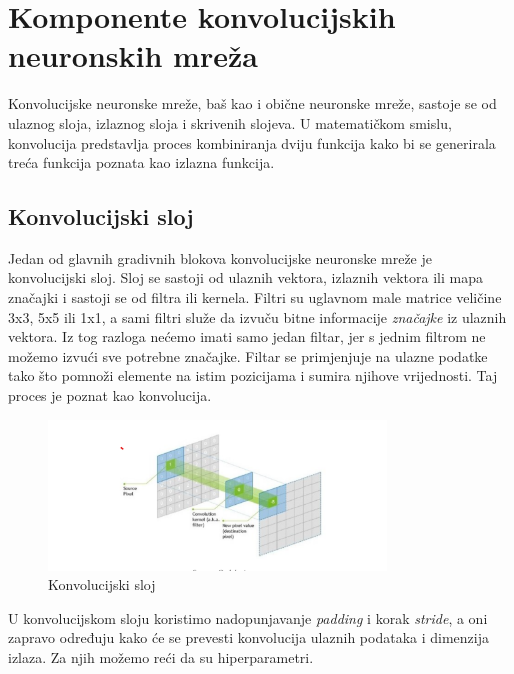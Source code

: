 
\chapter{Komponente konvolucijskih neuronskih mreža}\label{ch:komponente-konvolucijskih-neuronskih-mreza}
Konvolucijske neuronske mreže, baš kao i obične neuronske mreže, sastoje se od ulaznog sloja, izlaznog sloja i skrivenih slojeva.
U matematičkom smislu, konvolucija predstavlja proces kombiniranja dviju funkcija kako bi se generirala treća funkcija poznata kao izlazna funkcija.

\section{Konvolucijski sloj}\label{sec:konvolucijski-sloj}
Jedan od glavnih gradivnih blokova konvolucijske neuronske mreže je konvolucijski sloj.
Sloj se sastoji od ulaznih vektora, izlaznih vektora ili mapa značajki i sastoji se od filtra ili kernela.
Filtri su uglavnom male matrice veličine 3x3, 5x5 ili 1x1, a sami filtri služe da izvuču bitne informacije \emph{značajke} iz ulaznih vektora.
Iz tog razloga nećemo imati samo jedan filtar, jer s jednim filtrom ne možemo izvući sve potrebne značajke.
Filtar se primjenjuje na ulazne podatke tako što pomnoži elemente na istim pozicijama i sumira njihove vrijednosti.
Taj proces je poznat kao konvolucija.

\FloatBarrier
\begin{figure}[h]
    \centering
    \includegraphics[width=0.8\textwidth]{images/Convolution}
    \caption{Konvolucijski sloj}
    \label{fig:slika13}
\end{figure}
\FloatBarrier

U konvolucijskom sloju koristimo nadopunjavanje \emph{padding} i korak \emph{stride}, a oni zapravo određuju kako će se prevesti konvolucija ulaznih podataka i dimenzija izlaza.
Za njih možemo reći da su hiperparametri.

